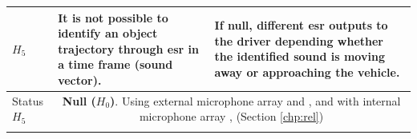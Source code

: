 \begin{table}[ht!]
\begin{tabular}{p{1.7cm}|p{6.5cm}|p{6.5cm}}
        $H_5$ & 
        It is not possible to identify an object trajectory through \gls{esr} in a time frame (sound vector). & 
        If null, different \gls{esr} outputs to the driver depending whether the identified sound is moving away or approaching the vehicle.\\
        \hline
        \rowcolor{gray!20} Status $H_5$ & \multicolumn{2}{c}{\parbox{13.4cm}{\textbf{Null ($H_0$)}. Using external microphone array \cite{Marchegiani2022} and \cite{Sun2021}, and with internal microphone array \cite{Shabtai2019}, (Section \ref{chp:rel}) }} \\           
        \Xhline{2\arrayrulewidth}
    \end{tabular}
\end{table}

